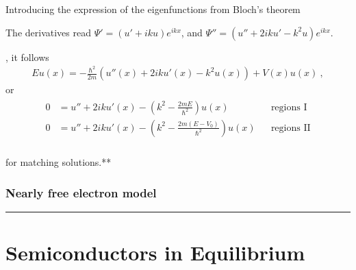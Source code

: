 \documentclass[letterpaper,10pt,english]{jupyterBook}
\begin{document}
\sphinxAtStartPar
Introducing the expression of the eigenfunctions from Bloch’s theorem%
\begin{footnote}[1]\sphinxAtStartFootnote
The derivatives read \(\Psi' = \left( u' + i k u \right) e^{i k x}\), and \(\Psi'' = \left( u'' + 2 ik u' - k^2 u \right) e^{ikx}\).
%
\end{footnote}, it follows
\begin{equation*}
\begin{split}E u(x) = - \frac{\hbar^2}{2m} \left( u''(x) + 2 ik u'(x) - k^2 u(x)  \right) + V(x) u(x) \ ,\end{split}
\end{equation*}
\sphinxAtStartPar
or
\begin{equation*}
\begin{split}\begin{aligned}
  0 & = u'' + 2 i k u'(x) - \left( k^2 - \frac{2m E}{\hbar^2} \right) u(x) && \text{regions I} \\
  0 & = u'' + 2 i k u'(x) - \left( k^2 - \frac{2m ( E - V_0 )}{\hbar^2} \right) u(x) && \text{regions II} \\
\end{aligned}\end{split}
\end{equation*}
\sphinxAtStartPar
{}

\sphinxAtStartPar
{} for matching solutions.**

\sphinxAtStartPar
{}


\subsubsection{Nearly free electron model}
\label{\detokenize{ch/solid-state/semiconductors-solids-qm:nearly-free-electron-model}}\label{\detokenize{ch/solid-state/semiconductors-solids-qm:semiconductors-solids-qm-energy-bands-nearly-free-electron}}

\bigskip\hrule\bigskip


\sphinxstepscope


\section{Semiconductors in Equilibrium}
\label{\detokenize{ch/solid-state/semiconductors-equilibrium:semiconductors-in-equilibrium}}\label{\detokenize{ch/solid-state/semiconductors-equilibrium:semiconductors-equilibrium}}\label{\detokenize{ch/solid-state/semiconductors-equilibrium::doc}}
\end{document}
